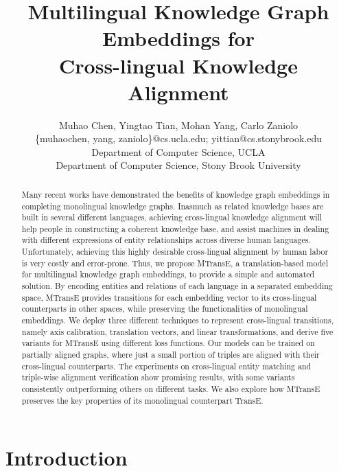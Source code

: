 \documentclass{article}
\begin{document}
\title{Multilingual Knowledge Graph Embeddings for\\ Cross-lingual Knowledge Alignment}


\author{Muhao Chen, Yingtao Tian, Mohan Yang, Carlo Zaniolo\\
\{muhaochen, yang, zaniolo\}@cs.ucla.edu; yittian@cs.stonybrook.edu\\
Department of Computer Science, UCLA\\
Department of Computer Science, Stony Brook University\\
}
\maketitle

\begin{abstract}


Many recent works have demonstrated the benefits of knowledge graph embeddings in completing monolingual knowledge graphs.
Inasmuch as related knowledge bases are built in several different languages, achieving cross-lingual knowledge alignment will help people in constructing a \mbox{coherent} knowledge base, and assist machines in dealing with different expressions of entity relationships across diverse human languages.
Unfortunately, achieving this highly desirable cross-lingual alignment
by human labor is very costly and error-prone.
Thus,
we propose MTransE, a translation-based model for multilingual knowledge graph embeddings, to provide a simple and automated solution.
By encoding
entities and relations of each language in a separated embedding space, MTransE
provides transitions for each
embedding vector to its cross-lingual counterparts in other spaces, while preserving the functionalities of monolingual embeddings.
We deploy three different techniques to represent cross-lingual transitions, namely axis calibration, translation vectors, and linear transformations, and derive five
variants for MTransE using
different loss functions.
Our models can be
trained on partially aligned graphs, where just a small portion of triples are aligned with their cross-lingual counterparts.
The experiments on cross-lingual entity matching and triple-wise alignment verification show promising results, with some variants consistently outperforming others on different tasks.
We also explore how MTransE preserves the key properties of its monolingual counterpart TransE.
\end{abstract}

\section{Introduction}
\end{document}
